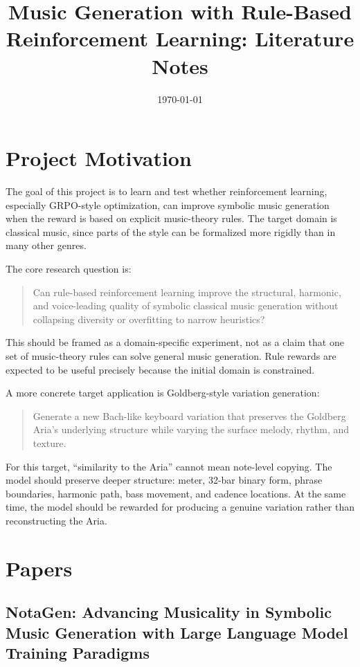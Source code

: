 \documentclass[11pt]{article}
\title{Music Generation with Rule-Based Reinforcement Learning: Literature Notes}
\author{}
\date{\today}
\begin{document}
\maketitle

\section{Project Motivation}
\label{sec:motivation}

The goal of this project is to learn and test whether reinforcement learning,
especially GRPO-style optimization, can improve symbolic music generation when
the reward is based on explicit music-theory rules. The target domain is
classical music, since parts of the style can be formalized more rigidly than in
many other genres.

The core research question is:

\begin{quote}
Can rule-based reinforcement learning improve the structural, harmonic, and
voice-leading quality of symbolic classical music generation without collapsing
diversity or overfitting to narrow heuristics?
\end{quote}

This should be framed as a domain-specific experiment, not as a claim that one
set of music-theory rules can solve general music generation. Rule rewards are
expected to be useful precisely because the initial domain is constrained.

A more concrete target application is Goldberg-style variation generation:

\begin{quote}
Generate a new Bach-like keyboard variation that preserves the Goldberg Aria's
underlying structure while varying the surface melody, rhythm, and texture.
\end{quote}

For this target, ``similarity to the Aria'' cannot mean note-level copying. The
model should preserve deeper structure: meter, 32-bar binary form, phrase
boundaries, harmonic path, bass movement, and cadence locations. At the same
time, the model should be rewarded for producing a genuine variation rather than
reconstructing the Aria.

\section{Papers}
\label{sec:papers}

\subsection{NotaGen: Advancing Musicality in Symbolic Music Generation with Large Language Model Training Paradigms}
\label{sec:paper-notagen}
\end{document}
